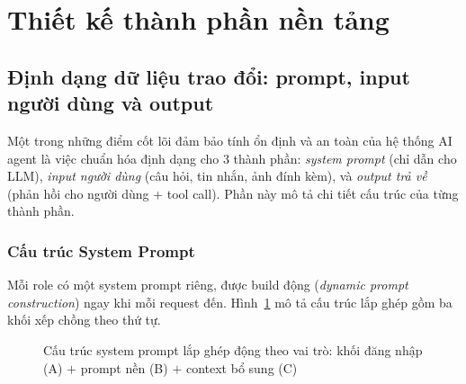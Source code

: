 \documentclass[a4paper,13pt,3p,twoside,openany]{report}
\theoremstyle{definition}
\theoremstyle{remark}
\theoremstyle{definition}
\let\ORIGsection\section
\let\ORIGsubsection\subsection
\renewcommand{\section}{\needspace{3\baselineskip}\ORIGsection}
\renewcommand{\subsection}{\needspace{3\baselineskip}\ORIGsubsection}
\begin{document}
\section{Thiết kế thành phần nền tảng}

\subsection{Định dạng dữ liệu trao đổi: prompt, input người dùng và output}

Một trong những điểm cốt lõi đảm bảo tính ổn định và an toàn của hệ thống AI agent là việc chuẩn hóa định dạng cho 3 thành phần: \textit{system prompt} (chỉ dẫn cho LLM), \textit{input người dùng} (câu hỏi, tin nhắn, ảnh đính kèm), và \textit{output trả về} (phản hồi cho người dùng + tool call). Phần này mô tả chi tiết cấu trúc của từng thành phần.

\subsubsection{Cấu trúc System Prompt}

Mỗi role có một system prompt riêng, được build động (\textit{dynamic prompt construction}) ngay khi mỗi request đến. Hình~\ref{fig:system-prompt} mô tả cấu trúc lắp ghép gồm ba khối xếp chồng theo thứ tự.

\begin{figure}[htbp]
\centering
{}
\caption{Cấu trúc system prompt lắp ghép động theo vai trò: khối đăng nhập (A) $+$ prompt nền (B) $+$ context bổ sung (C)}
\label{fig:system-prompt}
\end{figure}
\end{document}
